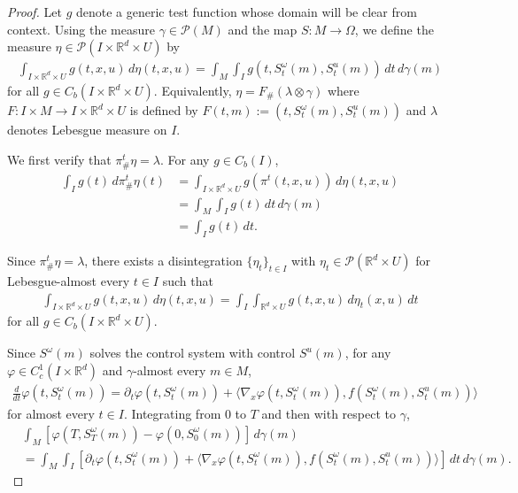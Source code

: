 \documentclass{article}
\begin{document}
\begin{proof}
Let $g$ denote a generic test function whose domain will be clear from context. Using the measure $\gamma \in \mathcal{P}(M)$ and the map $S: M \rightarrow \Omega$, we define the measure $\eta \in \mathcal{P}(I \times \mathbb{R}^d \times U)$ by
\begin{align}
\int_{I \times \mathbb{R}^d \times U} g(t,x,u) \, d\eta(t,x,u) = \int_{M} \int_{I} g(t,S^\omega_t(m),S^u_t(m)) \, dt \, d\gamma(m)
\end{align}
for all $g \in C_b(I \times \mathbb{R}^d \times U)$. Equivalently, $\eta = F_{\#}(\lambda \otimes \gamma)$ where $F: I \times M \rightarrow I \times \mathbb{R}^d \times U$ is defined by $F(t,m) := (t,S^\omega_t(m),S^u_t(m))$ and $\lambda$ denotes Lebesgue measure on $I$.

We first verify that $\pi^t_{\#}\eta = \lambda$. For any $g \in C_b(I)$,
\begin{align}
\int_{I} g(t) \, d\pi^t_{\#}\eta(t) &= \int_{I \times \mathbb{R}^d \times U} g(\pi^t(t,x,u)) \, d\eta(t,x,u) \\
&= \int_{M} \int_{I} g(t) \, dt \, d\gamma(m) \\
&= \int_{I} g(t) \, dt.
\end{align}

Since $\pi^t_{\#}\eta = \lambda$, there exists a disintegration $\{\eta_t\}_{t \in I}$ with $\eta_t \in \mathcal{P}(\mathbb{R}^d \times U)$ for Lebesgue-almost every $t \in I$ such that
\begin{align}
\int_{I \times \mathbb{R}^d \times U} g(t,x,u) \, d\eta(t,x,u) = \int_{I} \int_{\mathbb{R}^d \times U} g(t,x,u) \, d\eta_t(x,u) \, dt
\end{align}
for all $g \in C_b(I \times \mathbb{R}^d \times U)$.

Since $S^\omega(m)$ solves the control system with control $S^u(m)$, for any $\varphi \in C^1_c(I \times \mathbb{R}^d)$ and $\gamma$-almost every $m \in M$,
\begin{align}
\frac{d}{dt}\varphi(t,S^\omega_t(m)) = \partial_t \varphi(t,S^\omega_t(m)) + \langle \nabla_x \varphi(t,S^\omega_t(m)), f(S^\omega_t(m),S^u_t(m)) \rangle
\end{align}
for almost every $t \in I$. Integrating from $0$ to $T$ and then with respect to $\gamma$,
\begin{align}
&\int_{M} [\varphi(T,S^\omega_T(m)) - \varphi(0,S^\omega_0(m))] \, d\gamma(m) \\
&= \int_{M} \int_{I} [\partial_t \varphi(t,S^\omega_t(m)) + \langle \nabla_x \varphi(t,S^\omega_t(m)), f(S^\omega_t(m),S^u_t(m)) \rangle] \, dt \, d\gamma(m).
\end{align}


\end{proof}
\end{document}
